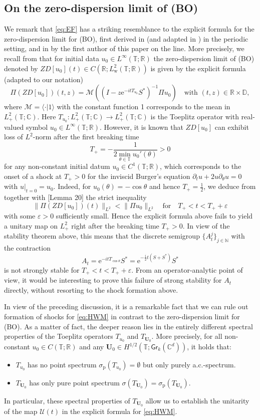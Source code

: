 \documentclass[10pt,reqno,a4paper]{amsart}
\theoremstyle{definition}
\theoremstyle{remark}
\theoremstyle{remark}
\numberwithin{equation}{section}
\newcommand{\C}{\mathbb{C}}
\newcommand{\N}{\mathbb{N}}
\newcommand{\R}{\mathbb{R}}
\newcommand{\T}{\mathbb{T}}
\newcommand{\D}{\mathbb{D}}
\newcommand{\Mean}{\mathscr{M}}
\newcommand{\pt}{\partial}
\renewcommand{\sp}{\sigma_{\mathrm{p}}}
\newcommand{\eps}{\varepsilon}
\newcommand{\eu}{\mathrm{e}}
\newcommand{\Ub}{\mathbf{U}}
\newcommand{\id}{I}
\newcommand{\Gr}{\mathsf{Gr}}
\newcommand{\Us}{\mathscr{U}}
\begin{document}
\subsection{On the zero-dispersion limit of (BO)}
\label{subsec:ZD_BO}
We remark that \eqref{eq:EF} has a striking resemblance to the explicit formula for the zero-dispersion limit for (BO), first derived in \cite{Ga-23a} (and adapted in \cite{Ma-25}) in the periodic setting, and in \cite{Ge-24} by the first author of this paper on the line. More precisely, we recall from \cite{Ga-23a, Ma-25} that for initial data $u_0 \in L^\infty(\T;\R)$ the zero-dispersion limit of (BO) denoted by $ZD[u_0](t) \in C(\R; L^2_{\mathrm{w}}(\T;\R))$ is given by the explicit formula (adapted to our notation) 
$$
\Pi (ZD[u_0])(t,z) = \Mean \left ( (\id - z \eu^{-it T_{u_0}} S^*)^{-1} \Pi u_0 \right ) \quad \mbox{with $(t,z) \in \R \times \D$},
$$
where $\Mean = \langle \cdot | 1 \rangle$ with the constant function 1 corresponds to the mean in $L^2_+(\T; \C)$. Here $T_{u_0} : L^2_+(\T; \C) \to L^2_+(\T;\C)$ is the Toeplitz operator with real-valued symbol $u_0 \in L^\infty(\T;\R)$. However, it is known that $ZD[u_0]$ can exhibit loss of $L^2$-norm after the first breaking time 
$$
T_+ = - \frac{1}{2 \min_{\theta \in \T} u_0'(\theta)} > 0
$$
for any non-constant initial datum $u_0 \in C^1(\T; \R)$, which corresponds to the onset of a shock at $T_+>0$ for the inviscid Burger's equation $\pt_t u + 2 u \pt_\theta u = 0$ with $u |_{t=0}=u_0$. Indeed, for $u_0(\theta) = -\cos  \theta$ and hence $T_+ = \frac{1}{2}$, we deduce from \cite{Ma-25} together with \cite{Ga-23}[Lemma 20] the strict inequality
$$
\| \Pi (ZD[u_0])(t) \|_{L^2} < \| \Pi u_0 \|_{L^2} \quad \mbox{for} \quad T_+ < t < T_+ + \eps
$$ 
with some $\eps > 0$ sufficiently small. Hence the explicit formula above fails to yield a unitary map on $L^2_+$ right after the breaking time $T_+> 0$. In view of the stability theorem above, this means that the discrete semigroup $\{ A_t^j \}_{j \in \N}$ with the contraction
$$
A_t = \eu^{-it T_{\cos \theta}} S^*  = \eu^{-\frac{i}{2} t (S + S^*)} S^*
$$ 
is not strongly stable for $T_+ < t < T_+ + \eps$. From an operator-analytic point of view, it would be interesting to prove this failure of strong stability for $A_t$ directly, without resorting to the shock formation above.

In view of the preceding discussion, it is a remarkable fact that we can rule out formation of shocks for \eqref{eq:HWM} in contrast to the zero-dispersion limit for (BO). As a matter of fact, the deeper reason lies in the entirely different spectral properties of the Toeplitz operators $T_{u_0}$ and $T_{\Ub_0}$. More precisely, for all non-constant $u_0 \in C(\T; \R)$ and any $\Ub_0 \in H^{1/2}(\T; \Gr_k(\C^d))$, it holds that:
\begin{itemize}
\item $T_{u_0}$ has no point spectrum $\sp(T_{u_0}) = \emptyset$ but only purely a.c.-spectrum.
\item $T_{\Ub_0}$ has only pure point spectrum $\sigma(T_{\Ub_0}) = \sp(T_{\Ub_0})$.
\end{itemize}
In particular, these spectral properties of $T_{\Ub_0}$ allow us to establish the unitarity of the map $\Us(t)$ in the explicit formula for \eqref{eq:HWM}.
\end{document}
